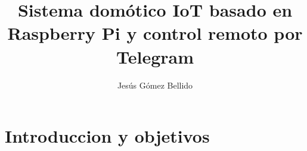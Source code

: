 \documentclass[10pt,journal,compsoc]{IEEEtran}
\begin{document}
\title{Sistema domótico IoT basado en Raspberry Pi y control remoto por Telegram}
\author{Jesús Gómez Bellido}



\maketitle


\IEEEdisplaynontitleabstractindextext


%
\IEEEpeerreviewmaketitle

\section{Introduccion y objetivos}\label{sec:introduccion}
\end{document}
